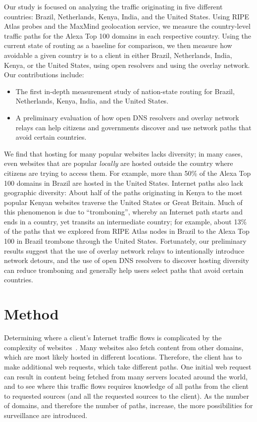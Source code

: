 Our study is focused on analyzing the traffic originating in
five different countries: Brazil, Netherlands, Kenya, India, and the
United States.  Using RIPE Atlas probes and the MaxMind geolocation
service, we measure the country-level traffic paths for the Alexa Top
100 domains in each respective country.  Using the current state of
routing as a baseline for comparison, we then measure how avoidable a
given country is to a client in either Brazil, Netherlands, India,
Kenya, or the United States, using open resolvers and using the overlay
network.  Our contributions include: 

\begin{itemize}
\item The first in-depth measurement study of
  nation-state routing for Brazil, Netherlands, Kenya, India, and the
  United States. 
\item A preliminary evaluation of how open DNS resolvers and overlay
  network relays can help citizens and governments discover and use
  network paths that avoid certain countries.
\end{itemize}
\noindent
We find that hosting for many popular websites lacks diversity; in many
cases, even websites that are popular {\em locally} are hosted outside
the country where citizens are trying to access them. For example, more
than 50\% of the Alexa Top 100 domains in Brazil are hosted in the
United States. Internet paths also lack geographic diversity: About half
of the paths originating in Kenya to the most popular Kenyan websites
traverse the United States or Great Britain. Much of this phenomenon is
due to ``tromboning'', whereby an Internet path starts and ends in a
country, yet transits an intermediate country; for example, about 13\%
of the paths that we explored from RIPE Atlas nodes in Brazil to the
Alexa Top 100 in Brazil trombone through the United States. Fortunately,
our preliminary results suggest that the use of overlay network relays
to intentionally introduce network detours, and the use of open DNS
resolvers to discover hosting diversity can reduce tromboning and
generally help users select paths that avoid certain countries.

\section{Method}

Determining where a client's Internet traffic flows is complicated by
the complexity of websites~\cite{butkiewicz2011understanding}.  Many
websites also fetch content from other domains, which are most likely
hosted in different locations.  Therefore, the client has to make
additional web requests, which take different paths.  One initial web
request can result in content being fetched from many servers located
around the world, and to see where this traffic flows requires knowledge
of all paths from the client to requested sources (and all the requested
sources to the client).  As the number of domains, and therefore the
number of paths, increase, the more possibilities for surveillance are
introduced. 


